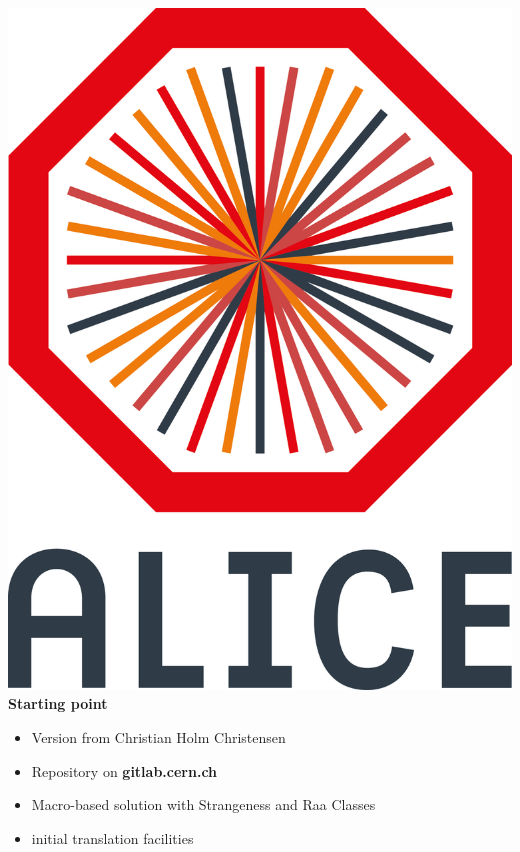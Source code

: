 \documentclass[aspectratio=169,14pt,dvipsnames]{beamer}
\begin{document}
\begin{frame}{\includegraphics[height=0.07\textheight]{2012-Jul-04-4_Color_Logo_CB.png} \hspace{0.2cm}\textbf{Starting point}}
  \begin{itemize}
    \item Version from Christian Holm Christensen
    \item Repository on \textbf{gitlab.cern.ch}
    \item Macro-based solution with Strangeness and Raa Classes
    \item initial translation facilities
  \end{itemize}
\end{frame}
\end{document}
